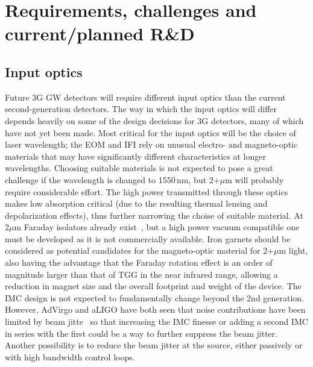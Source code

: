 %
%
%
%
\section{Requirements, challenges and current/planned R\&D}
\subsection{Input optics}
 Future 3G GW detectors will require different input optics than the current second-generation detectors. The way in which the input optics will differ depends heavily on some of the design decisions for 3G detectors, many of which have not yet been made. Most critical for the input optics will be the choice of laser wavelength; the EOM and IFI rely on unusual electro- and magneto-optic materials that may have significantly different characteristics at longer wavelengths. Choosing suitable materials is not expected to pose a great challenge if the wavelength is changed to 1550\,nm, but 2+$\mu$m will probably require considerable effort. The high power transmitted through these optics makes low absorption critical (due to the resulting thermal lensing and depolarization effects), thus further narrowing the choise of suitable material. At 2$\mu$m Faraday isolators already exist~\cite{EOTFI}, but a high power vacuum compatible one must be developed as it is not commercially available. Iron garnets should be considered as potential candidates for the magneto-optic material for 2+$\mu$m light, also
having the advantage that the Faraday rotation effect is an order of magnitude larger than that of TGG in the near infrared range, allowing a reduction in magnet size and the overall footprint and weight of the device.
The IMC design is not expected to fundamentally change beyond the 2nd generation.  However, AdVirgo and aLIGO have both seen that noise contributions have been limited by beam jitte~\cite{aLIGOjitter,adVirgojitter} so that increasing the IMC finesse or adding a second IMC in series with the first could be a way to further suppress the beam jitter. Another possibility is to reduce the beam jitter at the source, either passively or with high bandwidth control loops.  

